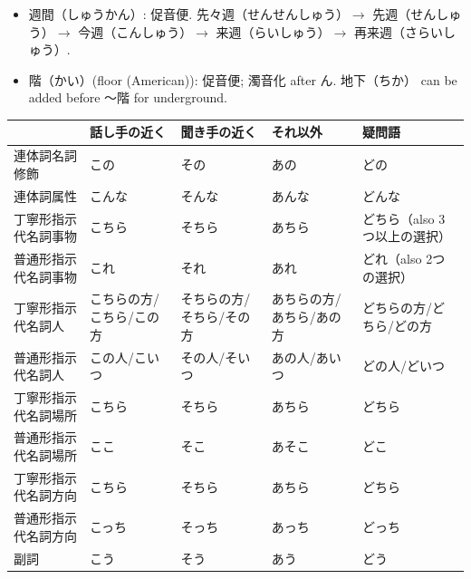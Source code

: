 \documentclass[a4paper,12pt]{article}
\begin{document}
\begin{itemize}
\item 週間（しゅうかん）: 促音便. 先々週（せんせんしゅう）$\rightarrow$ 先週（せんしゅう）$\rightarrow$ 今週（こんしゅう）$\rightarrow$ 来週（らいしゅう）$\rightarrow$ 再来週（さらいしゅう）.
\item 階（かい）(floor (American)): 促音便; 濁音化 after ん. 地下（ちか） can be added before 〜階 for underground.
\end{itemize}
\begin{longtable}[c]{|C{0.16\textwidth}|C{0.16\textwidth}|C{0.16\textwidth}|C{0.16\textwidth}|C{0.16\textwidth}|}
\hline
 & 話し手の近く & 聞き手の近く & それ以外 & 疑問語 \\\hline
連体詞名詞修飾 & この & その & あの & どの \\\hline
連体詞属性 & こんな & そんな & あんな & どんな \\\hline
丁寧形指示代名詞事物 & こちら & そちら & あちら & どちら（also 3つ以上の選択） \\\hline
普通形指示代名詞事物 & これ & それ & あれ & どれ（also 2つの選択） \\\hline
丁寧形指示代名詞人 & こちらの方/こちら/この方 & そちらの方/そちら/その方 & あちらの方/あちら/あの方 & どちらの方/どちら/どの方 \\\hline
普通形指示代名詞人 & この人/こいつ & その人/そいつ & あの人/あいつ & どの人/どいつ \\\hline
丁寧形指示代名詞場所 & こちら & そちら & あちら & どちら \\\hline
普通形指示代名詞場所 & ここ & そこ & あそこ & どこ \\\hline
丁寧形指示代名詞方向 & こちら & そちら & あちら & どちら \\\hline
普通形指示代名詞方向 & こっち & そっち & あっち & どっち \\\hline
副詞 & こう & そう & あう & どう \\\hline
\end{longtable}
\end{document}
